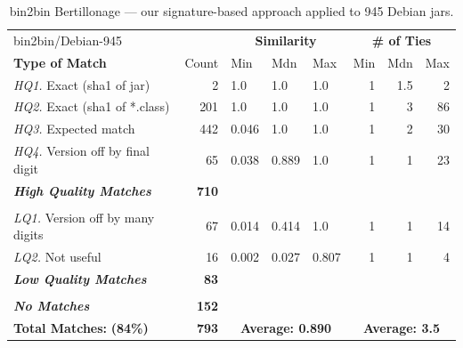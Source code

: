 \begin{table}[h]
    \centering
    \begin{tabular}[htbp]{l|r|lll|rrr}
        bin2bin/Debian-945         &              & \multicolumn{3}{c|}{\textbf{Similarity}}  & \multicolumn{3}{c}{\textbf{\# of Ties}} \\
        \textbf{Type of Match}     & Count        & Min   & Mdn    & Max   & Min  & Mdn  & Max  \\
        \hline
        \emph{HQ1.} Exact (sha1 of jar)        &   2          & 1.0   & 1.0    & 1.0   & 1    & 1.5  &  2   \\
        \emph{HQ2.} Exact (sha1 of *.class)    & 201          & 1.0   & 1.0    & 1.0   & 1    & 3    & 86   \\
        \emph{HQ3.} Expected match             & 442          & 0.046 & 1.0    & 1.0   & 1    & 2    & 30   \\
        \emph{HQ4.} Version off by final digit &  65          & 0.038 & 0.889  & 1.0   & 1    & 1    & 23   \\
        \emph{\textbf{High Quality Matches}}   & \textbf{710} &       &        &       &      &      &      \\
        & & & & & & & \\
        \emph{LQ1.} Version off by many digits &  67          & 0.014 & 0.414  & 1.0   & 1    & 1    & 14   \\
        \emph{LQ2.} Not useful                 &  16          & 0.002 & 0.027  & 0.807 & 1    & 1    &  4   \\
        \emph{\textbf{Low Quality Matches}}    & \textbf{83}  &       &        &       &      &      &      \\
        & & & & & & & \\
        \emph{\textbf{No Matches}}             & \textbf{152} &       &        &       &      &      &     \\
        \hline
        \textbf{Total Matches:} \hspace{3em}    \textbf{(84\%)} &  \textbf{793}   & \multicolumn{3}{c|}{\textbf{Average: 0.890}}  & \multicolumn{3}{c}{\textbf{Average: 3.5}} \\
    \end{tabular}
    \caption{bin2bin Bertillonage --- our signature-based approach applied to
    945 Debian jars.}
    \label{tab:debianBin2Bin}
\end{table}


